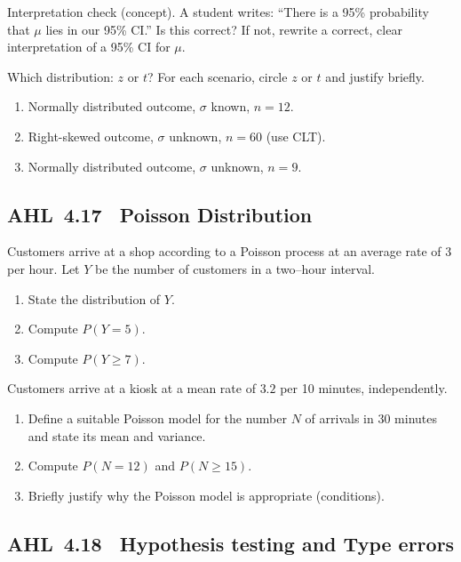 \documentclass[11pt]{article}
\def\textbf#1{#1}%
\newcommand{\tocsubsection}[1]{\subsection{#1}}
\newcounter{question}
\begin{document}
\begin{question}
\textbf{Interpretation check (concept).}
A student writes: “There is a 95\% probability that $\mu$ lies in our 95\% CI.” 
Is this correct? If not, rewrite a correct, clear interpretation of a 95\% CI for $\mu$.
\end{question}

\begin{question}
\textbf{Which distribution: $z$ or $t$?}
For each scenario, circle $z$ or $t$ and justify briefly.
\begin{enumerate}
  \item Normally distributed outcome, $\sigma$ known, $n=12$.
  \item Right-skewed outcome, $\sigma$ unknown, $n=60$ (use CLT).
  \item Normally distributed outcome, $\sigma$ unknown, $n=9$.
\end{enumerate}
\end{question}



\tocsubsection{AHL 4.17 \; Poisson Distribution}

\begin{question}
Customers arrive at a shop according to a Poisson process at an average rate of $3$ per hour.
Let $Y$ be the number of customers in a two–hour interval.
\begin{enumerate}[label=(\roman*)]
\item State the distribution of $Y$.
\item Compute $P(Y=5)$.
\item Compute $P(Y\ge 7)$.
\end{enumerate}
\end{question}

\begin{question}
Customers arrive at a kiosk at a mean rate of $3.2$ per 10 minutes, independently.
\begin{enumerate}
  \item Define a suitable Poisson model for the number $N$ of arrivals in 30 minutes and state its mean and variance.
  \item Compute $P(N=12)$ and $P(N\ge 15)$.
  \item Briefly justify why the Poisson model is appropriate (conditions).
\end{enumerate}
\end{question}


\tocsubsection{AHL 4.18 \; Hypothesis testing and Type errors}
\end{document}
